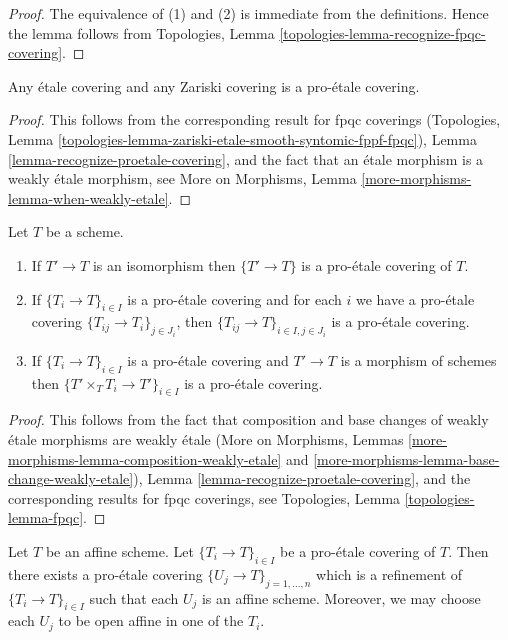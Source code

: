\begin{proof}
The equivalence of (1) and (2) is immediate from the definitions.
Hence the lemma follows from
Topologies, Lemma \ref{topologies-lemma-recognize-fpqc-covering}.
\end{proof}

\begin{lemma}
\label{lemma-etale-proetale}
Any \'etale covering and any Zariski covering is a pro-\'etale covering.
\end{lemma}

\begin{proof}
This follows from the corresponding result for fpqc coverings
(Topologies, Lemma
\ref{topologies-lemma-zariski-etale-smooth-syntomic-fppf-fpqc}),
Lemma \ref{lemma-recognize-proetale-covering}, and
the fact that an \'etale morphism is a weakly \'etale morphism, see
More on Morphisms, Lemma \ref{more-morphisms-lemma-when-weakly-etale}.
\end{proof}

\begin{lemma}
\label{lemma-proetale}
Let $T$ be a scheme.
\begin{enumerate}
\item If $T' \to T$ is an isomorphism then $\{T' \to T\}$
is a pro-\'etale covering of $T$.
\item If $\{T_i \to T\}_{i\in I}$ is a pro-\'etale covering and for each
$i$ we have a pro-\'etale covering $\{T_{ij} \to T_i\}_{j\in J_i}$, then
$\{T_{ij} \to T\}_{i \in I, j\in J_i}$ is a pro-\'etale covering.
\item If $\{T_i \to T\}_{i\in I}$ is a pro-\'etale covering
and $T' \to T$ is a morphism of schemes then
$\{T' \times_T T_i \to T'\}_{i\in I}$ is a pro-\'etale covering.
\end{enumerate}
\end{lemma}

\begin{proof}
This follows from the fact that composition and base changes
of weakly \'etale morphisms are weakly \'etale
(More on Morphisms, Lemmas
\ref{more-morphisms-lemma-composition-weakly-etale} and
\ref{more-morphisms-lemma-base-change-weakly-etale}),
Lemma \ref{lemma-recognize-proetale-covering}, and
the corresponding results for fpqc coverings, see
Topologies, Lemma \ref{topologies-lemma-fpqc}.
\end{proof}

\begin{lemma}
\label{lemma-proetale-affine}
Let $T$ be an affine scheme. Let $\{T_i \to T\}_{i \in I}$ be a pro-\'etale
covering of $T$. Then there exists a pro-\'etale covering
$\{U_j \to T\}_{j = 1, \ldots, n}$ which is a refinement
of $\{T_i \to T\}_{i \in I}$ such that each $U_j$ is an affine
scheme. Moreover, we may choose each $U_j$ to be open affine
in one of the $T_i$.
\end{lemma}

